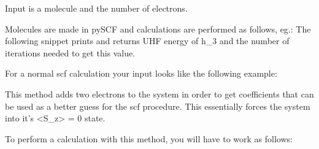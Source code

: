 \documentclass[letterpaper,10pt,english]{sphinxmanual}
\begin{document}
\begin{fulllineitems}
\label{\detokenize{UHF:ghf.UHF.UHF}}
Input is a molecule and the number of electrons.

Molecules are made in pySCF and calculations are performed as follows, eg.:
The following snippet prints and returns UHF energy of h\_3
and the number of iterations needed to get this value.

For a normal scf calculation your input looks like the following example:

\begin{sphinxVerbatim}[commandchars=\\\{\}]
          
   
\end{sphinxVerbatim}

\begin{fulllineitems}
\label{\detokenize{UHF:ghf.UHF.UHF.extra_electron_guess}}
This method adds two electrons to the system in order to get coefficients that can be used as a better guess
for the scf procedure. This essentially forces the system into it’s \textless{}S\_z\textgreater{} = 0 state.

To perform a calculation with this method, you will have to work as follows:


\end{fulllineitems}
\end{fulllineitems}
\end{document}
